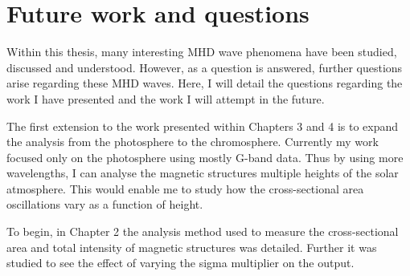 \section{Future work and questions}

    Within this thesis, many interesting MHD wave phenomena have been studied, discussed and understood.
    However, as a question is answered, further questions arise regarding these MHD waves.
    Here, I will detail the questions regarding the work I have presented and the work I will attempt in the future.
                 
    The first extension to the work presented within Chapters 3 and 4 is to expand the analysis from the photosphere to the chromosphere.
    Currently my work focused only on the photosphere using mostly G-band data.
    Thus by using more wavelengths, I can analyse the magnetic structures multiple heights of the solar atmosphere.
    This would enable me to study how the cross-sectional area oscillations vary as a function of height.
    
    To begin, in Chapter 2 the analysis method used to measure the cross-sectional area and total intensity of magnetic structures was detailed.
    Further it was studied to see the effect of varying the sigma multiplier on the output.
    
